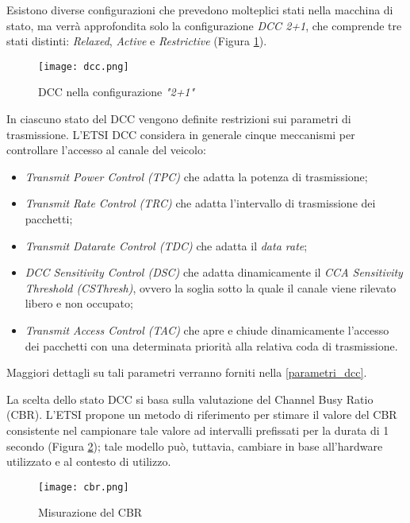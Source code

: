 Esistono diverse configurazioni che prevedono molteplici stati nella macchina di stato, ma verrà approfondita solo la configurazione \textit{DCC 2+1}, che comprende tre stati distinti: \textit{Relaxed}, \textit{Active} e \textit{Restrictive} (Figura \ref{fig:dcc}).

\begin{figure}[h!]
    \centering
    \texttt{[image: dcc.png]}
    \caption{DCC nella configurazione \textit{"2+1"}}
    \label{fig:dcc}
\end{figure}

In ciascuno stato del DCC vengono definite restrizioni sui parametri di trasmissione. L'ETSI DCC considera in generale cinque meccanismi per controllare l'accesso al canale del veicolo:

\begin{itemize}
    \item \textit{Transmit Power Control (TPC)} che adatta la potenza di trasmissione;
    \item \textit{Transmit Rate Control (TRC)} che adatta l'intervallo di trasmissione dei pacchetti;
    \item \textit{Transmit Datarate Control (TDC)} che adatta il \textit{data rate};
    \item \textit{DCC Sensitivity Control (DSC)} che adatta dinamicamente il \textit{CCA Sensitivity Threshold (CSThresh)}, ovvero la soglia sotto la quale il canale viene rilevato libero e non occupato;
    \item \textit{Transmit Access Control (TAC)} che apre e chiude dinamicamente l'accesso dei pacchetti con una determinata priorità alla relativa coda di trasmissione.
\end{itemize}

\noindent Maggiori dettagli su tali parametri verranno forniti nella \autoref{parametri_dcc}.

La scelta dello stato DCC si basa sulla valutazione del Channel Busy Ratio (CBR). L'ETSI propone un metodo di riferimento per stimare il valore del CBR consistente nel campionare tale valore ad intervalli prefissati per la durata di 1 secondo (Figura \ref{fig:cbr}); tale modello può, tuttavia, cambiare in base all'hardware utilizzato e al contesto di utilizzo.

\begin{figure}[h!]
    \centering
    \texttt{[image: cbr.png]}
    \caption{Misurazione del CBR}
    \label{fig:cbr}
\end{figure}

